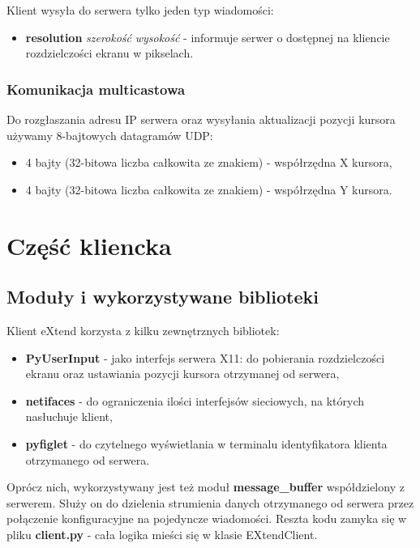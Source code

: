       Klient wysyła do serwera tylko jeden typ wiadomości:
      \begin{itemize}
        \item \textbf{resolution} \emph{szerokość} \emph{wysokość} - informuje serwer o dostępnej na kliencie rozdzielczości ekranu w pikselach.
      \end{itemize}


    \subsubsection{Komunikacja multicastowa}

      Do rozgłaszania adresu IP serwera oraz wysyłania aktualizacji pozycji kursora używamy 8-bajtowych datagramów UDP:
      \begin{itemize}
        \item 4 bajty (32-bitowa liczba całkowita ze znakiem) - współrzędna X kursora,
        \item 4 bajty (32-bitowa liczba całkowita ze znakiem) - współrzędna Y kursora.
      \end{itemize}

\section{Część kliencka}

  \subsection{Moduły i wykorzystywane biblioteki}
    Klient eXtend korzysta z kilku zewnętrznych bibliotek:
    \begin{itemize}
      \item \textbf{PyUserInput} \cite{PyUserInput} - jako interfejs serwera X11: do pobierania rozdzielczości ekranu oraz ustawiania pozycji kursora otrzymanej od serwera,
      \item \textbf{netifaces} \cite{Netifaces} - do ograniczenia ilości interfejsów sieciowych, na których nasłuchuje klient,
      \item \textbf{pyfiglet} \cite{Pyfiglet}  - do czytelnego wyświetlania w terminalu identyfikatora klienta otrzymanego od serwera.
    \end{itemize}

    Oprócz nich, wykorzystywany jest też moduł \textbf{message\_buffer} współdzielony z serwerem. Służy on do dzielenia strumienia danych otrzymanego od serwera przez połączenie konfiguracyjne na pojedyncze wiadomości. Reszta kodu zamyka się w pliku \textbf{client.py} - cała logika mieści się w klasie EXtendClient.

